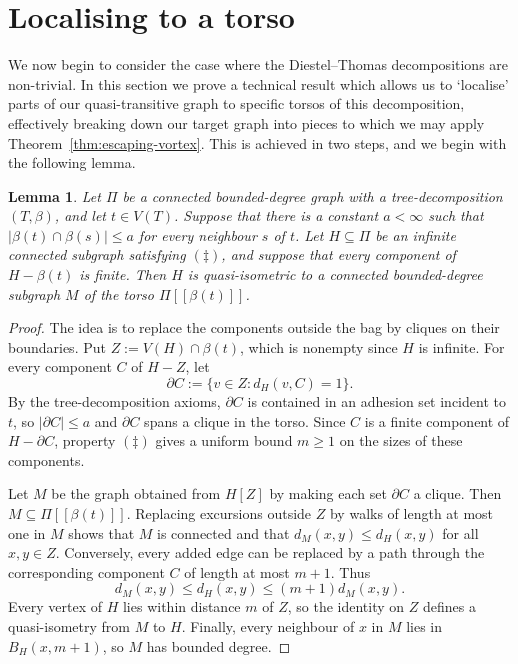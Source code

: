 \documentclass[10pt,a4paper]{amsart}
\newtheorem{lemma}[theorem]{Lemma}
\theoremstyle{definition}
\begin{document}
\section{Localising to a torso}\label{sec:localising-torso}

We now begin to consider the case where the Diestel--Thomas decompositions are non-trivial. In this section we prove a technical result which allows us to `localise' parts of our quasi-transitive graph to specific torsos of this decomposition, effectively breaking down our target graph into pieces to which we may apply Theorem~\ref{thm:escaping-vortex}. This is achieved in two steps, and we begin with the following lemma. 


\begin{lemma}\label{lem:torso-localisation}
Let $\Pi$ be a connected bounded-degree graph with a tree-decomposition $(T,\beta)$, and let $t\in V(T)$. Suppose that there is a constant $a<\infty$ such that $|\beta(t)\cap\beta(s)|\leq a$ for every neighbour $s$ of $t$. Let $H\subseteq\Pi$ be an infinite connected subgraph satisfying $(\ddagger)$, and suppose that every component of $H-\beta(t)$ is finite. Then $H$ is quasi-isometric to a connected bounded-degree subgraph $M$ of the torso $\Pi[\![\beta(t)]\!]$.
\end{lemma}

\begin{proof}
The idea is to replace the components outside the bag by cliques on their boundaries. Put $Z:=V(H)\cap\beta(t)$, which is nonempty since $H$ is infinite.
For every component $C$ of $H-Z$, let 
$$
\partial C := \{v \in Z : d_H(v, C) = 1\}. 
$$
By the tree-decomposition axioms, $\partial C$ is contained in an adhesion set incident to $t$, so $|\partial C|\leq a$ and $\partial C$ spans a clique in the torso. Since $C$ is a finite component of $H-\partial C$, property $(\ddagger)$ gives a uniform bound $m\geq1$ on the sizes of these components.

Let $M$ be the graph obtained from $H[Z]$ by making each set $\partial C$ a clique. Then $M\subseteq\Pi[\![\beta(t)]\!]$. Replacing excursions outside $Z$ by walks of length at most one in $M$ shows that $M$ is connected and that $d_M(x,y)\leq d_H(x,y)$ for all $x,y\in Z$. Conversely, every added edge can be replaced by a path through the corresponding component $C$ of length at most $m+1$. Thus
$$
d_M(x,y)\leq d_H(x,y)\leq(m+1)d_M(x,y).
$$
Every vertex of $H$ lies within distance $m$ of $Z$, so the identity on $Z$ defines a quasi-isometry from $M$ to $H$. 
Finally, every neighbour of $x$ in $M$ lies in $B_H(x,m+1)$, so $M$ has bounded degree.
\end{proof}
\end{document}

